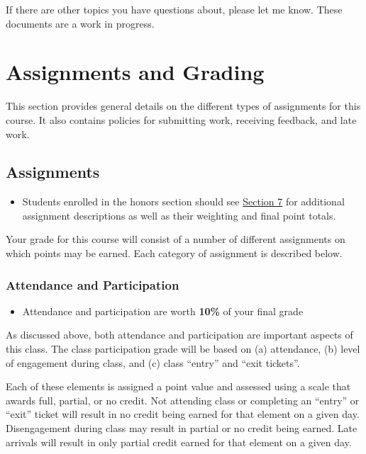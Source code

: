 \documentclass[]{book}
\newenvironment{rmdblock}[1]
  {\begin{shaded*}
  \begin{itemize}
  \renewcommand{\labelitemi}{
    \raisebox{-.7\height}[0pt][0pt]{
      {\setkeys{Gin}{width=3em,keepaspectratio}\texttt{[image: images/\#1]}}
    }
  }
  \item
  }
  {
  \end{itemize}
  \end{shaded*}
  }
\newenvironment{rmdtip}
  {\begin{rmdblock}{tip}}
  {\end{rmdblock}}
\newenvironment{rmdwarning}
  {\begin{rmdblock}{warning}}
  {\end{rmdblock}}
\begin{document}
If there are other topics you have questions about, please let me know. These documents are a work in progress.

\hypertarget{assignments-and-grading}{%
\chapter{Assignments and Grading}\label{assignments-and-grading}}

This section provides general details on the different types of assignments for this course. It also contains policies for submitting work, receiving feedback, and late work.

\hypertarget{assignments}{%
\section{Assignments}\label{assignments}}

\begin{rmdwarning}
Students enrolled in the honors section should see
\href{/syllabus/honors-overview.html}{Section 7} for additional
assignment descriptions as well as their weighting and final point
totals.
\end{rmdwarning}

Your grade for this course will consist of a number of different assignments on which points may be earned. Each category of assignment is described below.

\hypertarget{attendance-and-participation-1}{%
\subsection{Attendance and Participation}\label{attendance-and-participation-1}}

\begin{rmdtip}
Attendance and participation are worth \textbf{10\%} of your final grade
\end{rmdtip}

As discussed above, both attendance and participation are important aspects of this class. The class participation grade will be based on (a) attendance, (b) level of engagement during class, and (c) class ``entry'' and ``exit tickets''.

Each of these elements is assigned a point value and assessed using a scale that awards full, partial, or no credit. Not attending class or completing an ``entry'' or ``exit'' ticket will result in no credit being earned for that element on a given day. Disengagement during class may result in partial or no credit being earned. Late arrivals will result in only partial credit earned for that element on a given day.
\end{document}
